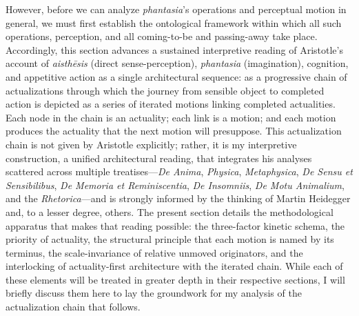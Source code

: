 However, before we can analyze \textit{phantasia}'s operations and perceptual motion in general, we must first establish the ontological framework within which all such operations, perception, and all coming-to-be and passing-away take place. Accordingly, this section advances a sustained interpretive reading of Aristotle's account of \textit{aisthēsis} (direct sense-perception), \textit{phantasia} (imagination), cognition, and appetitive action as a single architectural sequence: as a progressive chain of actualizations through which the journey from sensible object to completed action is depicted as a series of iterated motions linking completed actualities. Each node in the chain is an actuality; each link is a motion; and each motion produces the actuality that the next motion will presuppose. This actualization chain is not given by Aristotle explicitly; rather, it is my interpretive construction, a unified architectural reading, that integrates his analyses scattered across multiple treatises---\textit{De Anima}, \textit{Physica}, \textit{Metaphysica}, \textit{De Sensu et Sensibilibus}, \textit{De Memoria et Reminiscentia}, \textit{De Insomniis}, \textit{De Motu Animalium}, and the \textit{Rhetorica}---and is strongly informed by the thinking of Martin Heidegger and, to a lesser degree, others. The present section details the methodological apparatus that makes that reading possible: the three-factor kinetic schema, the priority of actuality, the structural principle that each motion is named by its terminus, the scale-invariance of relative unmoved originators, and the interlocking of actuality-first architecture with the iterated chain. While each of these elements will be treated in greater depth in their respective sections, I will briefly discuss them here to lay the groundwork for my analysis of the actualization chain that follows. 

